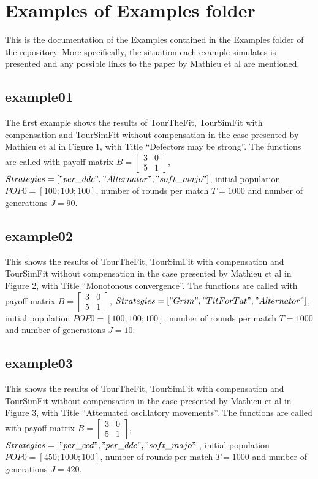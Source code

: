 \documentclass[12pt]{article}
\begin{document}
\section{Examples of Examples folder}
This is the documentation of the Examples contained in the Examples folder of the repository. More specifically, the situation each example simulates is presented and any possible links to the paper by Mathieu et al are mentioned.

\subsection{example01}
The first example shows the results of TourTheFit, TourSimFit with compensation and TourSimFit without compensation in the case presented by Mathieu et al in Figure 1, with Title ``Defectors may be strong''. The functions are called with payoff matrix $B = \begin{bmatrix} 3 & 0 \\ 5 & 1 \end{bmatrix}$, $Strategies = ["per\_ddc", "Alternator", "soft\_majo"]$, initial population $POP0 = [100; 100; 100]$, number of rounds per match $T = 1000$ and number of generations $J = 90$.

\subsection{example02}
This shows the results of TourTheFit, TourSimFit with compensation and TourSimFit without compensation in the case presented by Mathieu et al in Figure 2, with Title ``Monotonous convergence''. The functions are called with payoff matrix $B = \begin{bmatrix} 3 & 0 \\ 5 & 1 \end{bmatrix}$, $Strategies = ["Grim", "TitForTat", "Alternator"]$, initial population $POP0 = [100; 100; 100]$, number of rounds per match $T = 1000$ and number of generations $J = 10$.

\subsection{example03}
This shows the results of TourTheFit, TourSimFit with compensation and TourSimFit without compensation in the case presented by Mathieu et al in Figure 3, with Title ``Attenuated oscillatory movements''. The functions are called with payoff matrix $B = \begin{bmatrix} 3 & 0 \\ 5 & 1 \end{bmatrix}$, $Strategies = ["per\_ccd", "per\_ddc", "soft\_majo"]$, initial population $POP0 = [450; 1000; 100]$, number of rounds per match $T = 1000$ and number of generations $J = 420$.
\end{document}
